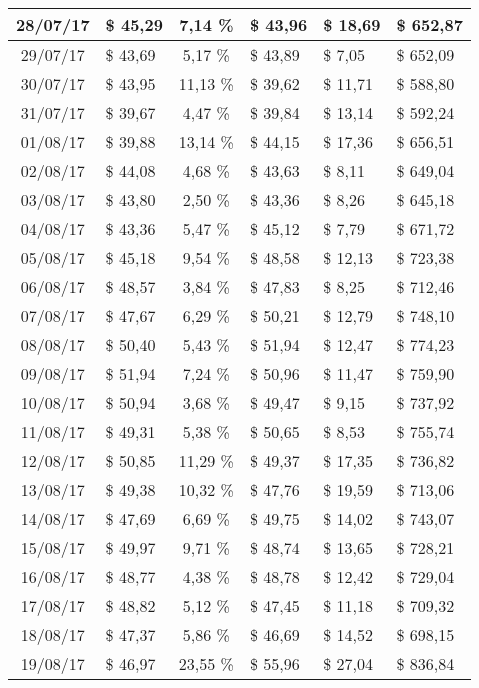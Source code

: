 \begin{center}
\begin{small}
\begin{longtable}{|c|l|c|l|l|l|}
28/07/17 & \$ 45,29 & 7,14 \% & \$ 43,96 & \$ 18,69 & \$ 652,87 \\ \hline
29/07/17 & \$ 43,69 & 5,17 \% & \$ 43,89 & \$ 7,05 & \$ 652,09 \\ \hline
30/07/17 & \$ 43,95 & 11,13 \% & \$ 39,62 & \$ 11,71 & \$ 588,80 \\ \hline
31/07/17 & \$ 39,67 & 4,47 \% & \$ 39,84 & \$ 13,14 & \$ 592,24 \\ \hline
01/08/17 & \$ 39,88 & 13,14 \% & \$ 44,15 & \$ 17,36 & \$ 656,51 \\ \hline
02/08/17 & \$ 44,08 & 4,68 \% & \$ 43,63 & \$ 8,11 & \$ 649,04 \\ \hline
03/08/17 & \$ 43,80 & 2,50 \% & \$ 43,36 & \$ 8,26 & \$ 645,18 \\ \hline
04/08/17 & \$ 43,36 & 5,47 \% & \$ 45,12 & \$ 7,79 & \$ 671,72 \\ \hline
05/08/17 & \$ 45,18 & 9,54 \% & \$ 48,58 & \$ 12,13 & \$ 723,38 \\ \hline
06/08/17 & \$ 48,57 & 3,84 \% & \$ 47,83 & \$ 8,25 & \$ 712,46 \\ \hline
07/08/17 & \$ 47,67 & 6,29 \% & \$ 50,21 & \$ 12,79 & \$ 748,10 \\ \hline
08/08/17 & \$ 50,40 & 5,43 \% & \$ 51,94 & \$ 12,47 & \$ 774,23 \\ \hline
09/08/17 & \$ 51,94 & 7,24 \% & \$ 50,96 & \$ 11,47 & \$ 759,90 \\ \hline
10/08/17 & \$ 50,94 & 3,68 \% & \$ 49,47 & \$ 9,15 & \$ 737,92 \\ \hline
11/08/17 & \$ 49,31 & 5,38 \% & \$ 50,65 & \$ 8,53 & \$ 755,74 \\ \hline
12/08/17 & \$ 50,85 & 11,29 \% & \$ 49,37 & \$ 17,35 & \$ 736,82 \\ \hline
13/08/17 & \$ 49,38 & 10,32 \% & \$ 47,76 & \$ 19,59 & \$ 713,06 \\ \hline
14/08/17 & \$ 47,69 & 6,69 \% & \$ 49,75 & \$ 14,02 & \$ 743,07 \\ \hline
15/08/17 & \$ 49,97 & 9,71 \% & \$ 48,74 & \$ 13,65 & \$ 728,21 \\ \hline
16/08/17 & \$ 48,77 & 4,38 \% & \$ 48,78 & \$ 12,42 & \$ 729,04 \\ \hline
17/08/17 & \$ 48,82 & 5,12 \% & \$ 47,45 & \$ 11,18 & \$ 709,32 \\ \hline
18/08/17 & \$ 47,37 & 5,86 \% & \$ 46,69 & \$ 14,52 & \$ 698,15 \\ \hline
19/08/17 & \$ 46,97 & 23,55 \% & \$ 55,96 & \$ 27,04 & \$ 836,84 \\ \hline

\end{longtable}
\end{small}
\end{center}
